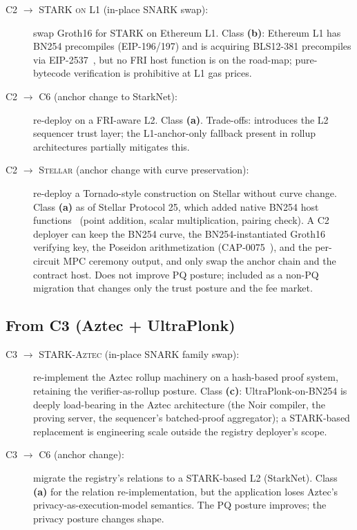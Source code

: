 \begin{description}
  \item[\textsc{C2 $\to$ STARK on L1} (in-place SNARK swap):] swap
    Groth16 for STARK on Ethereum L1. Class \textbf{(b)}:
    Ethereum L1 has BN254 precompiles (EIP-196/197) and is acquiring
    BLS12-381 precompiles via EIP-2537~\cite{eip-2537}, but no FRI
    host function is on the road-map; pure-bytecode verification is
    prohibitive at L1 gas prices.
  \item[\textsc{C2 $\to$ C6} (anchor change to StarkNet):] re-deploy
    on a FRI-aware L2. Class \textbf{(a)}. Trade-offs: introduces the
    L2 sequencer trust layer; the L1-anchor-only fallback present in
    rollup architectures partially mitigates this.
  \item[\textsc{C2 $\to$ Stellar} (anchor change with curve
    preservation):] re-deploy a Tornado-style construction on
    Stellar without curve change. Class \textbf{(a)} as of Stellar
    Protocol 25, which added native BN254 host
    functions~\cite{stellar-cap-0074} (point addition, scalar
    multiplication, pairing check). A C2 deployer can keep the
    BN254 curve, the BN254-instantiated Groth16 verifying key, the
    Poseidon arithmetization (CAP-0075~\cite{stellar-cap-0075}),
    and the per-circuit MPC ceremony output, and only swap the
    anchor chain and the contract host. Does not improve PQ
    posture; included as a non-PQ migration that changes only the
    trust posture and the fee market.
\end{description}

\subsection{From C3 (Aztec + UltraPlonk)}
\label{sec:mig-c3}

\begin{description}
  \item[\textsc{C3 $\to$ STARK-Aztec} (in-place SNARK family swap):]
    re-implement the Aztec rollup machinery on a hash-based proof
    system, retaining the verifier-as-rollup posture. Class
    \textbf{(c)}: UltraPlonk-on-BN254 is deeply load-bearing in the
    Aztec architecture (the Noir compiler, the proving server, the
    sequencer's batched-proof aggregator); a STARK-based replacement
    is engineering scale outside the registry deployer's scope.
  \item[\textsc{C3 $\to$ C6} (anchor change):] migrate the registry's
    relations to a STARK-based L2 (StarkNet). Class \textbf{(a)} for
    the relation re-implementation, but the application loses
    Aztec's privacy-as-execution-model semantics. The PQ posture
    improves; the privacy posture changes shape.
\end{description}

